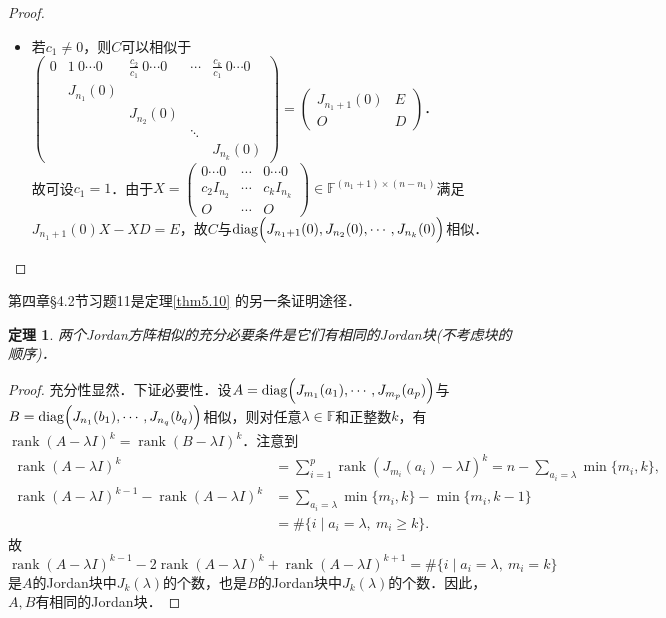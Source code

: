 \documentclass[a4paper,fontset=windows]{ctexbook}
\newtheorem{theorem}{定理}[chapter]
\theoremstyle{definition}
\DeclareMathOperator{\diag}{diag}
\DeclareMathOperator{\rank}{rank}
\def\note{\noindent\raisebox{10pt}{\dbend}\hspace{7pt}}
\renewcommand{\ge}{\geqslant}
\begin{document}
\begin{proof}
\begin{itemize}
\item 若$c_1\ne 0$，则$C$可以相似于$\begin{pmatrix}0&1~0\cdots 0&\frac{c_2}{c_1}~0\cdots 0&\cdots&\frac{c_k}{c_1}~0\cdots 0 \\ &J_{n_1}(0)&&& \\ &&J_{n_2}(0)&& \\ &&&\ddots& \\ &&&&J_{n_k}(0)\end{pmatrix}=\begin{pmatrix}J_{n_1+1}(0)&E \\ O&D\end{pmatrix}$．\\
故可设$c_1=1$．由于$X=\begin{pmatrix}0\cdots0&\cdots&0\cdots0 \\ c_2I_{n_2}&\cdots&c_kI_{n_k} \\ O&\cdots&O\end{pmatrix}\in\mathbb{F}^{(n_1+1)\times(n-n_1)}$满足$J_{n_1+1}(0)X-XD=E$，故$C$与$\diag\Bigl(J_{n_1+1}(0),J_{n_2}(0),\cdots,J_{n_k}(0)\Bigr)$相似．\qedhere
\end{itemize}
\end{proof}

\note 第四章\S 4.2节习题11是定理\ref{thm5.10} 的另一条证明途径．

\begin{theorem}\label{thm5.11}
两个Jordan方阵相似的充分必要条件是它们有相同的Jordan块(不考虑块的顺序)．
\end{theorem}

\begin{proof}
充分性显然．下证必要性．设$A=\diag\Bigl(J_{m_1}(a_1),\cdots,J_{m_p}(a_p)\Bigr)$与$B=\diag\Bigl(J_{n_1}(b_1),\cdots,\\ J_{n_q}(b_q)\Bigr)$相似，则对任意$\lambda\in\mathbb{F}$和正整数$k$，有$\rank(A-\lambda I)^k=\rank(B-\lambda I)^k$．注意到
\begin{align*}
\rank(A-\lambda I)^k&=\sum_{i=1}^p\rank(J_{m_i}(a_i)-\lambda I)^k=n-\sum_{a_i=\lambda}\min\{m_i,k\}, \\
\rank(A-\lambda I)^{k-1}-\rank(A-\lambda I)^k&=\sum_{a_i=\lambda}\min\{m_i,k\}-\min\{m_i,k-1\} \\
&=\#\{i\mid a_i=\lambda,~m_i\ge k\}.
\end{align*}
故$$\rank(A-\lambda I)^{k-1}-2\rank(A-\lambda I)^k+\rank(A-\lambda I)^{k+1}=\#\{i\mid a_i=\lambda,~m_i=k\}$$是$A$的Jordan块中$J_k(\lambda)$的个数，也是$B$的Jordan块中$J_k(\lambda)$的个数．因此，$A,B$有相同的Jordan块．
\end{proof}
\end{document}
